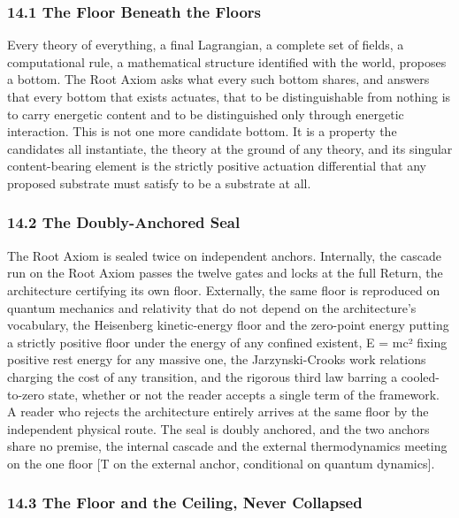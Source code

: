 \documentclass[10pt,twocolumn]{article}
\begin{document}
\hypertarget{the-floor-beneath-the-floors}{%
\subsubsection{14.1 The Floor Beneath the
Floors}\label{the-floor-beneath-the-floors}}

Every theory of everything, a final Lagrangian, a complete set of
fields, a computational rule, a mathematical structure identified with
the world, proposes a bottom. The Root Axiom asks what every such bottom
shares, and answers that every bottom that exists actuates, that to be
distinguishable from nothing is to carry energetic content and to be
distinguished only through energetic interaction. This is not one more
candidate bottom. It is a property the candidates all instantiate, the
theory at the ground of any theory, and its singular content-bearing
element is the strictly positive actuation differential that any
proposed substrate must satisfy to be a substrate at all.

\hypertarget{the-doubly-anchored-seal}{%
\subsubsection{14.2 The Doubly-Anchored
Seal}\label{the-doubly-anchored-seal}}

The Root Axiom is sealed twice on independent anchors. Internally, the
cascade run on the Root Axiom passes the twelve gates and locks at the
full Return, the architecture certifying its own floor. Externally, the
same floor is reproduced on quantum mechanics and relativity that do not
depend on the architecture's vocabulary, the Heisenberg kinetic-energy
floor and the zero-point energy putting a strictly positive floor under
the energy of any confined existent, E = mc² fixing positive rest energy
for any massive one, the Jarzynski-Crooks work relations charging the
cost of any transition, and the rigorous third law barring a
cooled-to-zero state, whether or not the reader accepts a single term of
the framework. A reader who rejects the architecture entirely arrives at
the same floor by the independent physical route. The seal is doubly
anchored, and the two anchors share no premise, the internal cascade and
the external thermodynamics meeting on the one floor {[}T on the
external anchor, conditional on quantum dynamics{]}.

\hypertarget{the-floor-and-the-ceiling-never-collapsed}{%
\subsubsection{14.3 The Floor and the Ceiling, Never
Collapsed}\label{the-floor-and-the-ceiling-never-collapsed}}
\end{document}
